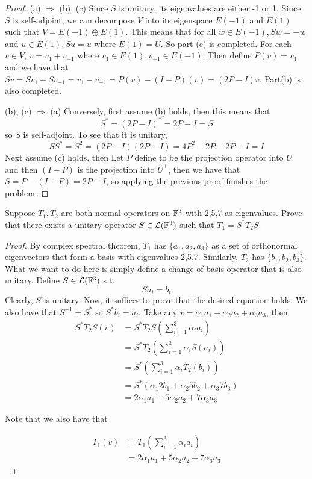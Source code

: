\documentclass{extarticle}
\begin{document}
\begin{proof}
(a) \(\Rightarrow\) (b), (c) Since \(S\) is unitary, its eigenvalues are either -1 or 1. Since 
\(S\) is self-adjoint, we can decompose \(V\) into its eigenspace \(E(-1)\) and 
\(E(1)\) such that \(V = E(-1) \oplus E(1)\). This means that for all \(w \in E(-1), 
Sw = - w\) and \(u \in E(1), S u = u\) where \(E(1) = U\). So part (c) is completed. For 
each \(v \in V\), \(v = v_1 + v_{-1}\) where \(v_1 \in E(1), v_{-1} \in E(-1)\). Then define 
\(P(v) = v_1\) and we have that \(Sv = Sv_1 + S v_{-1} = v_1 - v_{-1} = P(v) - (I - P)(v) 
= (2P - I) v\). Part(b) is also completed. 

(b), (c) \(\Rightarrow\) (a) Conversely, first assume (b) holds, then this means that 
\[S^* = (2P - I)^* = 2P - I = S\]
so \(S\) is self-adjoint. To see that it is unitary, 
\[SS^* = S^2 = (2P - I)(2P - I) = 4P^2 - 2P - 2P + I = I\]
Next assume (c) holds, then Let \(P\) define to be the projection operator into \(U\) and then 
\((I - P)\) is the projection into \(U^\perp\), then we have that \(S = P - (I - P) = 2P - I\), so 
applying the previous proof finishes the problem. 
\end{proof}

\begin{problem}{6}
    Suppose \(T_1, T_2\) are both normal operators on \(\mathbb{F}^3\) with 2,5,7 as eigenvalues. Prove 
    that there exists a unitary operator \(S \in \mathcal{L}(\mathbb{F}^3)\) such that \(T_1 = S^* T_2 S\).
\end{problem}

\begin{proof}
By complex spectral theorem, \(T_1\) has \(\{a_1, a_2, a_3\}\) as a set of orthonormal eigenvectors that 
form a basis with eigenvalues 2,5,7. Similarly, \(T_2\) has \(\{b_1, b_2, b_3\}\). What we want to 
do here is simply define a change-of-basis operator that is also unitary. Define \(S \in \mathcal{L}(\mathbb{F}^3)\) s.t. 
\[S a_i = b_i\] 
Clearly, \(S\) is unitary. Now, it suffices to prove that the desired equation holds. 
We also have that \(S^{-1} = S^* \) so \(S^* b_i = a_i\). Take any 
\(v = \alpha_1 a_1 + \alpha_2 a_2 + \alpha_3 a_3\), then 
\begin{align*}
    S^*T_2S (v) 
    &= S^*T_2 S \left(\sum_{i=1}^{3} \alpha_i a_i \right) \\ 
    &= S^*T_2 \left( \sum_{i=1}^{3} \alpha_i S(a_i) \right) \\ 
    &= S^* \left(\sum_{i=1}^{3} \alpha_i T_2(b_i) \right) \\ 
    &= S^* (\alpha_1 2b_1 + \alpha_2 5b_2 + \alpha_3 7b_3) \\ 
    &= 2 \alpha_1 a_1 + 5 \alpha_2 a_2 + 7 \alpha_3 a_3 
\end{align*}

Note that we also have that 

\begin{align*}
    T_1 (v) 
    &= T_1 \left(\sum_{i=1}^{3} \alpha_i a_i \right) \\ 
    &= 2\alpha_1 a_1 + 5 \alpha_2 a_2 + 7 \alpha_3 a_3
\end{align*}
\end{proof}
\end{document}
